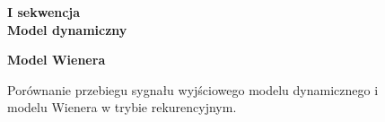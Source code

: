 \begin{figure}[h!]

\begin{center}
\Large \textbf{I sekwencja} \\
\vspace{0.5cm}
\Large \textbf{Model dynamiczny}
\end{center}

\centering
{}
\hfill
{}

\begin{center}
\Large \textbf{Model Wienera}
\end{center}

\hfill
{}
\caption{Porównanie przebiegu sygnału wyjściowego modelu dynamicznego i modelu Wienera w trybie rekurencyjnym.}
\end{figure}

